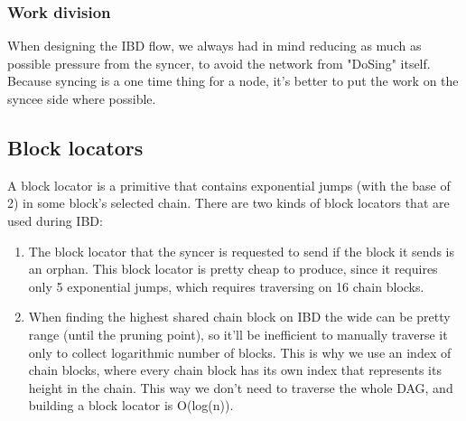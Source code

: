 \subsubsection{Work division}
\label{part2:kaspad:p2p:ibd:work_division}

When designing the IBD flow, we always had in mind reducing as much as possible pressure from the syncer, to avoid the
network from "DoSing" itself. Because syncing is a one time thing for a node, it's better to put the work on the syncee
side where possible.

\subsection{Block locators}
\label{part2:kaspad:p2p:ibd:block_locators}

A block locator is a primitive that contains exponential jumps (with the base of 2) in some block's selected chain.
There are two kinds of block locators that are used during IBD:

\begin{enumerate}
\item The block locator that the syncer is requested to send if the block it sends is an orphan. This block locator is
   pretty cheap to produce, since it requires only 5 exponential jumps, which requires traversing on 16 chain blocks.
\item When finding the highest shared chain block on IBD the wide can be pretty range (until the pruning point), so it'll
   be inefficient to manually traverse it only to collect logarithmic number of blocks. This is why we use an index of
   chain blocks, where every chain block has its own index that represents its height in the chain. This way we don't
   need to traverse the whole DAG, and building a block locator is O(log(n)).
\end{enumerate}